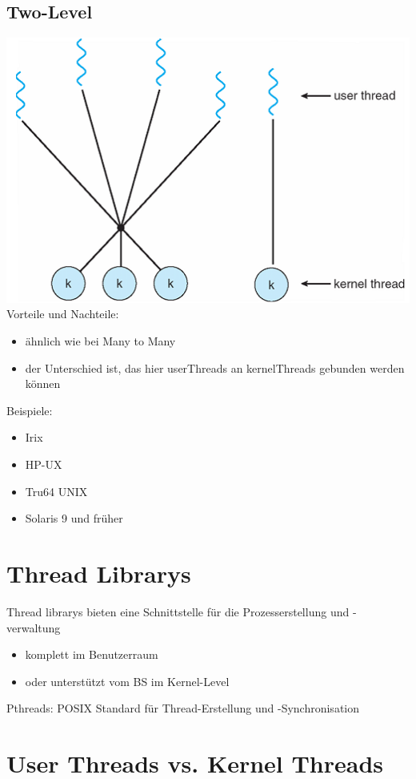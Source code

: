 \documentclass[a4paper]{scrreprt}
\begin{document}
	\subsection{Two-Level}
		\includegraphics[scale = 0.6]{graphics/two_level_model.png}
		Vorteile und Nachteile:
		\begin{itemize}
			\item ähnlich wie bei Many to Many
			\item der Unterschied ist, das hier userThreads an kernelThreads gebunden werden können
		\end{itemize}
		Beispiele:
		\begin{itemize}
			\item Irix
			\item HP-UX
			\item Tru64 UNIX
			\item Solaris 9 und früher
		\end{itemize}
		
\section{Thread Librarys}
Thread librarys bieten eine Schnittstelle für die Prozesserstellung und -verwaltung\\
\begin{itemize}
	\item komplett im Benutzerraum
	\item oder unterstützt vom BS im Kernel-Level
\end{itemize}
Pthreads: POSIX Standard für Thread-Erstellung und -Synchronisation\\
\section{User Threads vs. Kernel Threads}
\end{document}
